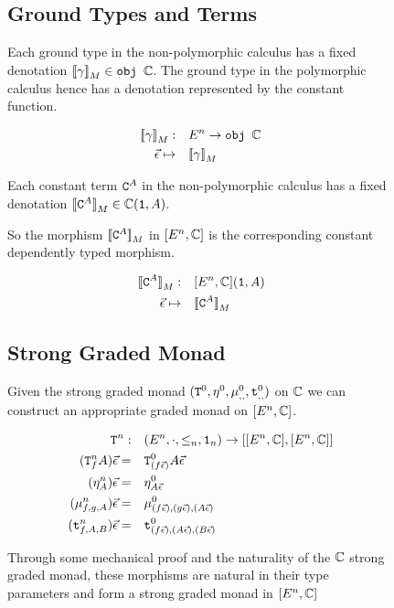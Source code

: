 \documentclass{Report}
\begin{document}
\begin{figure}
    \label{HowToBuildGround}
    \begin{framed}
        \subsection{Ground Types and Terms}
        Each ground type in the non-polymorphic calculus has a fixed denotation ${\bf [\![}\gamma{\bf ]\!]}_M\in\texttt{obj }\mathbb{C}$. The ground type in the polymorphic calculus hence has a denotation represented by the constant function.
        
        \begin{align}
            {\bf [\![}\gamma{\bf ]\!]}_M:&\quad E^n\rightarrow \texttt{obj }\mathbb{C}\\
            \vec{\epsilon} \mapsto&\quad  {\bf [\![}\gamma{\bf ]\!]}_M\\
        \end{align}
        
        Each constant term $\texttt{C}^{A}$ in the non-polymorphic calculus has a fixed denotation ${\bf [\![}\texttt{C}^{A}{\bf ]\!]}_M\in\mathbb{C}(\texttt{1}, A)$.
        
        So the morphism ${\bf [\![}\texttt{C}^{A}{\bf ]\!]}_M$ in $[E^n, \mathbb{C}]$ is the corresponding constant dependently typed morphism.
        
        \begin{align}
            {\bf [\![}\texttt{C}^{A}{\bf ]\!]}_M:&\quad[E^n, \mathbb{C}](\texttt{1}, A)\\
            \vec{\epsilon}\mapsto&\quad{\bf [\![}\texttt{C}^{A}{\bf ]\!]}_M
        \end{align}        
    \end{framed}
\end{figure}


\begin{figure}
    \label{HowToBuildMonad}
    \begin{framed}
        \subsection{Strong Graded Monad}
Given the strong graded monad $(\texttt{T}^0_{}, \eta_{}^0{}{}, \mu_{, , }^0, \texttt{t}_{, , }^0)$ on $\mathbb{C}$ we can construct an appropriate graded monad on $[E^n, \mathbb{C}]$.

\begin{align}
    \texttt{T}^n_{}:&\quad(E^n, \cdot, \leq_n, \texttt{1}_n) \rightarrow [[E^n, \mathbb{C}], [E^n, \mathbb{C}]]\\
    (\texttt{T}^n_{f}A)\vec{\epsilon}=&\quad \texttt{T}^0_{(f\vec{\epsilon})}A\vec{\epsilon}\\
    (\eta_{A}^n)\vec{\epsilon}=&\quad\eta_{A\vec{\epsilon}}^0\\
    (\mu_{f, g, A}^n)\vec{\epsilon}=&\quad\mu_{(f\vec{\epsilon}), (g\vec{\epsilon}), (A\vec{\epsilon})}^0\\
    (\texttt{t}_{f, A, B}^n)\vec{\epsilon}=&\quad\texttt{t}_{(f\vec{\epsilon}), (A\vec{\epsilon}), (B\vec{\epsilon})}^0
\end{align}

Through some mechanical proof and the naturality of the $\mathbb{C}$ strong graded monad, these morphisms are natural in their type parameters and form a strong graded monad in $[E^n, \mathbb{C}]$

    \end{framed}
\end{figure}
\end{document}
